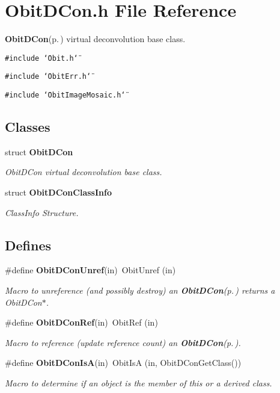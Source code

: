 \section{Obit\-DCon.h File Reference}
\label{ObitDCon_8h}
{\bf Obit\-DCon}{\rm (p.\,\pageref{structObitDCon})} virtual deconvolution base class. 

{\tt \#include \char`\"{}Obit.h\char`\"{}}\par
{\tt \#include \char`\"{}Obit\-Err.h\char`\"{}}\par
{\tt \#include \char`\"{}Obit\-Image\-Mosaic.h\char`\"{}}\par
\subsection*{Classes}
\begin{CompactItemize}
\item 
struct {\bf Obit\-DCon}
\begin{CompactList}\small\item\em Obit\-DCon virtual deconvolution base class. \item\end{CompactList}\item 
struct {\bf Obit\-DCon\-Class\-Info}
\begin{CompactList}\small\item\em Class\-Info Structure. \item\end{CompactList}\end{CompactItemize}
\subsection*{Defines}
\begin{CompactItemize}
\item 
\#define {\bf Obit\-DCon\-Unref}(in)\ Obit\-Unref (in)
\begin{CompactList}\small\item\em Macro to unreference (and possibly destroy) an {\bf Obit\-DCon}{\rm (p.\,\pageref{structObitDCon})} returns a Obit\-DCon$\ast$. \item\end{CompactList}\item 
\#define {\bf Obit\-DCon\-Ref}(in)\ Obit\-Ref (in)
\begin{CompactList}\small\item\em Macro to reference (update reference count) an {\bf Obit\-DCon}{\rm (p.\,\pageref{structObitDCon})}. \item\end{CompactList}\item 
\#define {\bf Obit\-DCon\-Is\-A}(in)\ Obit\-Is\-A (in, Obit\-DCon\-Get\-Class())
\begin{CompactList}\small\item\em Macro to determine if an object is the member of this or a derived class. \item\end{CompactList}\end{CompactItemize}
